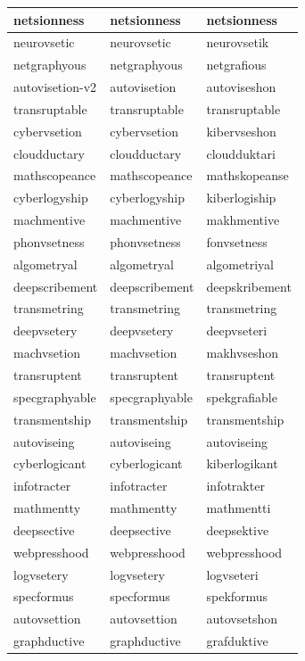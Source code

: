 \documentclass[10pt,twocolumn,letterpaper]{article}
\begin{document}
\begin{longtable}{|p{4cm}|p{4cm}|p{4cm}|}
netsionness & netsionness & netsionness \\ \hline
neurovsetic & neurovsetic & neurovsetik \\ \hline
netgraphyous & netgraphyous & netgrafious \\ \hline
autovisetion-v2 & autovisetion & autoviseshon \\ \hline
transruptable & transruptable & transruptable \\ \hline
cybervsetion & cybervsetion & kibervseshon \\ \hline
cloudductary & cloudductary & cloudduktari \\ \hline
mathscopeance & mathscopeance & mathskopeanse \\ \hline
cyberlogyship & cyberlogyship & kiberlogiship \\ \hline
machmentive & machmentive & makhmentive \\ \hline
phonvsetness & phonvsetness & fonvsetness \\ \hline
algometryal & algometryal & algometriyal \\ \hline
deepscribement & deepscribement & deepskribement \\ \hline
transmetring & transmetring & transmetring \\ \hline
deepvsetery & deepvsetery & deepvseteri \\ \hline
machvsetion & machvsetion & makhvseshon \\ \hline
transruptent & transruptent & transruptent \\ \hline
specgraphyable & specgraphyable & spekgrafiable \\ \hline
transmentship & transmentship & transmentship \\ \hline
autoviseing & autoviseing & autoviseing \\ \hline
cyberlogicant & cyberlogicant & kiberlogikant \\ \hline
infotracter & infotracter & infotrakter \\ \hline
mathmentty & mathmentty & mathmentti \\ \hline
deepsective & deepsective & deepsektive \\ \hline
webpresshood & webpresshood & webpresshood \\ \hline
logvsetery & logvsetery & logvseteri \\ \hline
specformus & specformus & spekformus \\ \hline
autovsettion & autovsettion & autovsetshon \\ \hline
graphductive & graphductive & grafduktive \\ \hline

\end{longtable}
\end{document}
